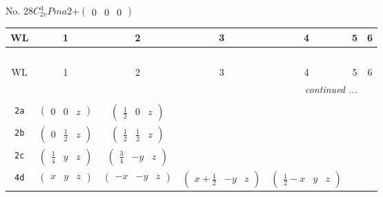 \documentclass[fleqn,9pt,landscape]{jsarticle}
\begin{document}
\newpage
No. 28\quad$C_{2v}^{4}$\quad$Pma2$\quad[ orthorhombic ]\quad$+\begin{pmatrix} 0 & 0 & 0 \end{pmatrix}$
\begin{center}
\renewcommand{\arraystretch}{1.2}
\begin{longtable}{ccccccc}
 \hline \hline
WL & 1 & 2 & 3 & 4 & 5 & 6 \\ \hline \endfirsthead

\multicolumn{6}{l}{\tablename\ \thetable{}} \\
 \hline \hline
WL & 1 & 2 & 3 & 4 & 5 & 6 \\ \hline \endhead

 \hline \hline
\multicolumn{6}{r}{\footnotesize\it continued ...} \\ \endfoot

 \hline \hline
\multicolumn{6}{r}{} \\ \endlastfoot

{\tt 2a} & $ \begin{pmatrix} 0 & 0 & z \end{pmatrix} $ & $ \begin{pmatrix} \frac{1}{2} & 0 & z \end{pmatrix} $ & $  $ & $  $ \\ \hline
{\tt 2b} & $ \begin{pmatrix} 0 & \frac{1}{2} & z \end{pmatrix} $ & $ \begin{pmatrix} \frac{1}{2} & \frac{1}{2} & z \end{pmatrix} $ & $  $ & $  $ \\ \hline
{\tt 2c} & $ \begin{pmatrix} \frac{1}{4} & y & z \end{pmatrix} $ & $ \begin{pmatrix} \frac{3}{4} & - y & z \end{pmatrix} $ & $  $ & $  $ \\ \hline
{\tt 4d} & $ \begin{pmatrix} x & y & z \end{pmatrix} $ & $ \begin{pmatrix} - x & - y & z \end{pmatrix} $ & $ \begin{pmatrix} x + \frac{1}{2} & - y & z \end{pmatrix} $ & $ \begin{pmatrix} \frac{1}{2} - x & y & z \end{pmatrix} $ \\
\end{longtable}
\end{center}
\end{document}
